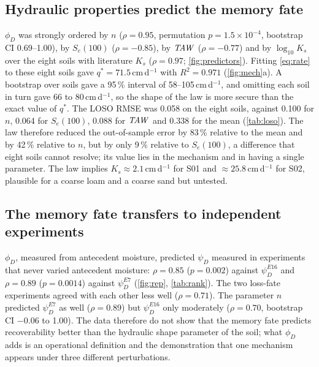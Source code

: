 \documentclass[review,12pt,authoryear]{elsarticle}
\begin{document}
\subsection{Hydraulic properties predict the memory fate}
$\phi_D$ was strongly ordered by $n$ ($\rho=0.95$, permutation $p=1.5\times10^{-4}$, bootstrap CI 0.69--1.00), by $S_e(100)$ ($\rho=-0.85$), by $\mathit{TAW}$ ($\rho=-0.77$) and by $\log_{10}K_s$ over the eight soils with literature $K_s$ ($\rho=0.97$; \cref{fig:predictors}). Fitting \cref{eq:rate} to these eight soils gave $q^\ast=71.5$\,cm\,d$^{-1}$ with $R^2=0.971$ (\cref{fig:mech}a). A bootstrap over soils gave a 95\,\% interval of 58--105\,cm\,d$^{-1}$, and omitting each soil in turn gave 66 to 80\,cm\,d$^{-1}$, so the shape of the law is more secure than the exact value of $q^\ast$. The LOSO RMSE was 0.058 on the eight soils, against 0.100 for $n$, 0.064 for $S_e(100)$, 0.088 for $\mathit{TAW}$ and 0.338 for the mean (\cref{tab:loso}). The law therefore reduced the out-of-sample error by 83\,\% relative to the mean and by 42\,\% relative to $n$, but by only 9\,\% relative to $S_e(100)$, a difference that eight soils cannot resolve; its value lies in the mechanism and in having a single parameter. The law implies $K_s\approx2.1$\,cm\,d$^{-1}$ for S01 and $\approx25.8$\,cm\,d$^{-1}$ for S02, plausible for a coarse loam and a coarse sand but untested.


\subsection{The memory fate transfers to independent experiments}
\label{sec:transfer}
$\phi_D$, measured from antecedent moisture, predicted $\psi_D$ measured in experiments that never varied antecedent moisture: $\rho=0.85$ ($p=0.002$) against $\psi_D^{E16}$ and $\rho=0.89$ ($p=0.0014$) against $\psi_D^{E7}$ (\cref{fig:rep}, \cref{tab:rank}). The two loss-fate experiments agreed with each other less well ($\rho=0.71$). The parameter $n$ predicted $\psi_D^{E7}$ as well ($\rho=0.89$) but $\psi_D^{E16}$ only moderately ($\rho=0.70$, bootstrap CI $-0.06$ to 1.00). The data therefore do not show that the memory fate predicts recoverability better than the hydraulic shape parameter of the soil; what $\phi_D$ adds is an operational definition and the demonstration that one mechanism appears under three different perturbations.

\end{document}
